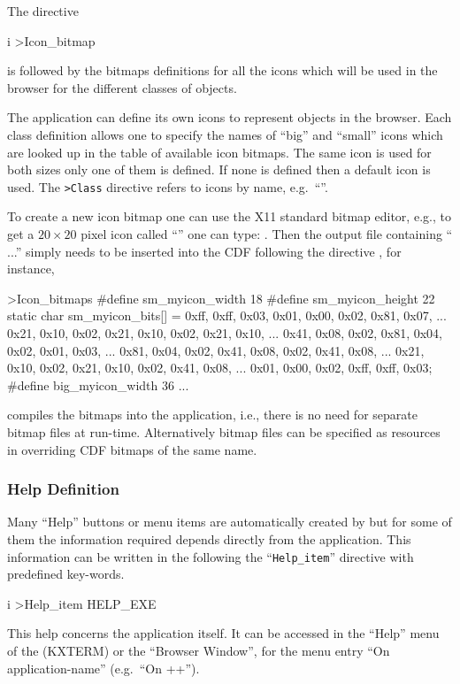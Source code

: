 The \CDF{} directive
\begin{Gray}{i}
>Icon_bitmap
\end{Gray}
is followed by the bitmaps definitions for all the icons which will be used
in the browser for the different classes of objects.
 
The application can define its own icons to represent objects in the browser.
Each class definition allows one to specify the names of ``big'' and
``small'' icons which are looked up in the table of available icon bitmaps.
The same icon is used for both sizes  only one of them is defined.
If none is defined then a default icon is used.
The {\tt >Class} directive refers to icons by name, e.g.\ ``''.
 
To create a new icon bitmap one can use the X11 standard bitmap
editor, e.g., to get a $20\times20$ pixel icon called
``'' one can type: .
Then the output file  containing
`` ...'' simply needs to be inserted into
the CDF following the directive , for instance,
\begin{XMP}
>Icon_bitmaps
#define sm_myicon_width 18
#define sm_myicon_height 22
static char sm_myicon_bits[] = \lcb
   0xff, 0xff, 0x03, 0x01, 0x00, 0x02, 0x81, 0x07, ...
   0x21, 0x10, 0x02, 0x21, 0x10, 0x02, 0x21, 0x10, ...
   0x41, 0x08, 0x02, 0x81, 0x04, 0x02, 0x01, 0x03, ...
   0x81, 0x04, 0x02, 0x41, 0x08, 0x02, 0x41, 0x08, ...
   0x21, 0x10, 0x02, 0x21, 0x10, 0x02, 0x41, 0x08, ...
   0x01, 0x00, 0x02, 0xff, 0xff, 0x03\rcb;
#define big_myicon_width 36
   ...
\end{XMP}
 compiles the bitmaps into the application, i.e.,
there is no need for separate bitmap files at run-time.
Alternatively bitmap files can be specified as resources in
 overriding CDF bitmaps of the same name.
 
\subsubsection{Help Definition}
\label{ref:rehlpdef}

Many ``Help'' buttons or menu items are automatically created by \KUIPMotif{}
but for some of them the information required depends directly from the
application. This information can be written in the \CDF{} following the
``{\tt Help\_item}'' directive with predefined key-words.
 
\begin{Gray}{i}
>Help_item  HELP_EXE
\end{Gray}
This help concerns the application itself. It can be accessed in the ``Help''
menu of the \EW{} (KXTERM) or the ``Browser Window'', for
the menu entry ``On application-name'' (e.g.\ ``On \PAW++{}'').
 
